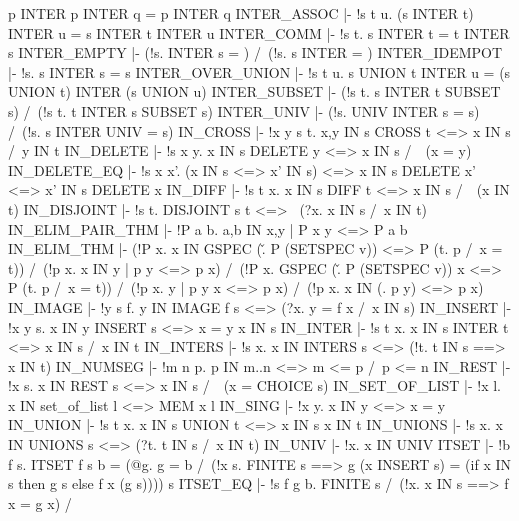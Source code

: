      p INTER p INTER q = p INTER q
\ENDTHEOREM
\THEOREM INTER\_ASSOC
  |- !s t u. (s INTER t) INTER u = s INTER t INTER u
\ENDTHEOREM
\THEOREM INTER\_COMM
  |- !s t. s INTER t = t INTER s
\ENDTHEOREM
\THEOREM INTER\_EMPTY
  |- (!s. {} INTER s = {}) /\ (!s. s INTER {} = {})
\ENDTHEOREM
\THEOREM INTER\_IDEMPOT
  |- !s. s INTER s = s
\ENDTHEOREM
\THEOREM INTER\_OVER\_UNION
  |- !s t u. s UNION t INTER u = (s UNION t) INTER (s UNION u)
\ENDTHEOREM
\THEOREM INTER\_SUBSET
  |- (!s t. s INTER t SUBSET s) /\ (!s t. t INTER s SUBSET s)
\ENDTHEOREM
\THEOREM INTER\_UNIV
  |- (!s. UNIV INTER s = s) /\ (!s. s INTER UNIV = s)
\ENDTHEOREM
\THEOREM IN\_CROSS
  |- !x y s t. x,y IN s CROSS t <=> x IN s /\ y IN t
\ENDTHEOREM
\THEOREM IN\_DELETE
  |- !s x y. x IN s DELETE y <=> x IN s /\ ~(x = y)
\ENDTHEOREM
\THEOREM IN\_DELETE\_EQ
  |- !s x x'. (x IN s <=> x' IN s) <=> x IN s DELETE x' <=> x' IN s DELETE x
\ENDTHEOREM
\THEOREM IN\_DIFF
  |- !s t x. x IN s DIFF t <=> x IN s /\ ~(x IN t)
\ENDTHEOREM
\THEOREM IN\_DISJOINT
  |- !s t. DISJOINT s t <=> ~(?x. x IN s /\ x IN t)
\ENDTHEOREM
\THEOREM IN\_ELIM\_PAIR\_THM
  |- !P a b. a,b IN {x,y | P x y} <=> P a b
\ENDTHEOREM
\THEOREM IN\_ELIM\_THM
  |- (!P x. x IN GSPEC (\v. P (SETSPEC v)) <=> P (\p t. p /\ x = t)) /\
     (!p x. x IN {y | p y} <=> p x) /\
     (!P x. GSPEC (\v. P (SETSPEC v)) x <=> P (\p t. p /\ x = t)) /\
     (!p x. {y | p y} x <=> p x) /\
     (!p x. x IN (\y. p y) <=> p x)
\ENDTHEOREM
\THEOREM IN\_IMAGE
  |- !y s f. y IN IMAGE f s <=> (?x. y = f x /\ x IN s)
\ENDTHEOREM
\THEOREM IN\_INSERT
  |- !x y s. x IN y INSERT s <=> x = y \/ x IN s
\ENDTHEOREM
\THEOREM IN\_INTER
  |- !s t x. x IN s INTER t <=> x IN s /\ x IN t
\ENDTHEOREM
\THEOREM IN\_INTERS
  |- !s x. x IN INTERS s <=> (!t. t IN s ==> x IN t)
\ENDTHEOREM
\THEOREM IN\_NUMSEG
  |- !m n p. p IN m..n <=> m <= p /\ p <= n
\ENDTHEOREM
\THEOREM IN\_REST
  |- !x s. x IN REST s <=> x IN s /\ ~(x = CHOICE s)
\ENDTHEOREM
\THEOREM IN\_SET\_OF\_LIST
  |- !x l. x IN set_of_list l <=> MEM x l
\ENDTHEOREM
\THEOREM IN\_SING
  |- !x y. x IN {y} <=> x = y
\ENDTHEOREM
\THEOREM IN\_UNION
  |- !s t x. x IN s UNION t <=> x IN s \/ x IN t
\ENDTHEOREM
\THEOREM IN\_UNIONS
  |- !s x. x IN UNIONS s <=> (?t. t IN s /\ x IN t)
\ENDTHEOREM
\THEOREM IN\_UNIV
  |- !x. x IN UNIV
\ENDTHEOREM
\THEOREM ITSET
  |- !b f s.
         ITSET f s b =
         (@g. g {} = b /\
              (!x s.
                   FINITE s
                   ==> g (x INSERT s) = (if x IN s then g s else f x (g s))))
         s
\ENDTHEOREM
\THEOREM ITSET\_EQ
  |- !s f g b.
         FINITE s /\
         (!x. x IN s ==> f x = g x) /\

